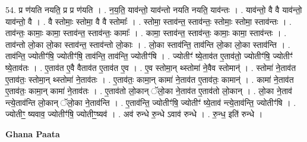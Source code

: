 \documentclass[17pt]{extarticle}
\begin{document}
54. प्र ण॑यति नयति॒ प्र प्र ण॑यति । . न॒य॒ति॒ याव॑न्तो॒ याव॑न्तो नयति नयति॒ याव॑न्तः । . याव॑न्तो॒ वै वै याव॑न्तो॒ याव॑न्तो॒ वै । . वै स्तोमाः॒ स्तोमा॒ वै वै स्तोमाः᳚ । . स्तोमा॒ स्ताव॑न्त॒ स्ताव॑न्तः॒ स्तोमाः॒ स्तोमा॒ स्ताव॑न्तः । . ताव॑न्तः॒ कामाः॒ कामा॒ स्ताव॑न्त॒ स्ताव॑न्तः॒ कामाः᳚ । . कामा॒ स्ताव॑न्त॒ स्ताव॑न्तः॒ कामाः॒ कामा॒ स्ताव॑न्तः । . ताव॑न्तो लो॒का लो॒का स्ताव॑न्त॒ स्ताव॑न्तो लो॒काः । . लो॒का स्ताव॑न्ति॒ ताव॑न्ति लो॒का लो॒का स्ताव॑न्ति । . ताव॑न्ति॒ ज्योतीꣳ॑षि॒ ज्योतीꣳ॑षि॒ ताव॑न्ति॒ ताव॑न्ति॒ ज्योतीꣳ॑षि । . ज्योतीꣳ॑ ष्ये॒ताव॑त ए॒ताव॑तो॒ ज्योतीꣳ॑षि॒ ज्योतीꣳ॑ ष्ये॒ताव॑तः । . ए॒ताव॑त ए॒वै वैताव॑त ए॒ताव॑त ए॒व । . ए॒व स्तोमा॒न् थ्स्तोमा॑ ने॒वैव स्तोमान्॑ । . स्तोमा॑ ने॒ताव॑त ए॒ताव॑तः॒ स्तोमा॒न् थ्स्तोमा॑ ने॒ताव॑तः । . ए॒ताव॑तः॒ कामा॒न् कामा॑ ने॒ताव॑त ए॒ताव॑तः॒ कामान्॑ । . कामा॑ ने॒ताव॑त ए॒ताव॑तः॒ कामा॒न् कामा॑ ने॒ताव॑तः । . ए॒ताव॑तो लो॒कान् ॅलो॒का ने॒ताव॑त ए॒ताव॑तो लो॒कान् । . लो॒का ने॒ताव॑ न्त्ये॒ताव॑न्ति लो॒कान् ॅलो॒का ने॒ताव॑न्ति । . ए॒ताव॑न्ति॒ ज्योतीꣳ॑षि॒ ज्योतीꣳ॑ ष्ये॒ताव॑ न्त्ये॒ताव॑न्ति॒ ज्योतीꣳ॑षि । . ज्योतीꣳ॒॒ ष्यवाव॒ ज्योतीꣳ॑षि॒ ज्योतीꣳ॒॒ष्यव॑ । . अव॑ रुन्धे रु॒न्धे ऽवाव॑ रुन्धे । . रु॒न्ध॒ इति॑ रुन्धे । \newline

\textbf{Ghana Paata } \newline
\end{document}
